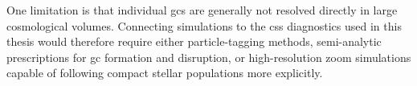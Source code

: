 One limitation is that individual \glspl{gc} are generally not resolved directly in large cosmological volumes. Connecting simulations to the \gls{css} diagnostics used in this thesis would therefore require either particle-tagging methods, semi-analytic prescriptions for \gls{gc} formation and disruption, or high-resolution zoom simulations capable of following compact stellar populations more explicitly.

